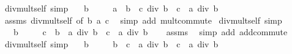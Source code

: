 \begin{isabellebody}
\isanewline
\isanewline
{}\isamarkupfalse%
\ div{\isacharunderscore}{\kern0pt}mult{\isacharunderscore}{\kern0pt}self{}\ {\isacharbrackleft}{\kern0pt}simp{\isacharbrackright}{\kern0pt}{\isacharcolon}{\kern0pt}\isanewline
\ \ \ {\isachardoublequoteopen}b\ {\isasymnoteq}\ {}{\isachardoublequoteclose}\isanewline
\ \ \ {\isachardoublequoteopen}{\isacharparenleft}{\kern0pt}a\ {\isacharplus}{\kern0pt}\ b\ {\isacharasterisk}{\kern0pt}\ c{\isacharparenright}{\kern0pt}\ div\ b\ {\isacharequal}{\kern0pt}\ c\ {\isacharplus}{\kern0pt}\ a\ div\ b{\isachardoublequoteclose}\isanewline
%
\isadelimproof
\ \ %
\endisadelimproof
%
\isatagproof
{}\isamarkupfalse%
\ assms\ div{\isacharunderscore}{\kern0pt}mult{\isacharunderscore}{\kern0pt}self{}\ {\isacharbrackleft}{\kern0pt}of\ b\ a\ c{\isacharbrackright}{\kern0pt}\ \isamarkupfalse%
\ {\isacharparenleft}{\kern0pt}simp\ add{\isacharcolon}{\kern0pt}\ mult{\isachardot}{\kern0pt}commute{\isacharparenright}{\kern0pt}%
\endisatagproof
{\isafoldproof}%
%
\isadelimproof
\isanewline
%
\endisadelimproof
\isanewline
{}\isamarkupfalse%
\ div{\isacharunderscore}{\kern0pt}mult{\isacharunderscore}{\kern0pt}self{}\ {\isacharbrackleft}{\kern0pt}simp{\isacharbrackright}{\kern0pt}{\isacharcolon}{\kern0pt}\isanewline
\ \ \ {\isachardoublequoteopen}b\ {\isasymnoteq}\ {}{\isachardoublequoteclose}\isanewline
\ \ \ {\isachardoublequoteopen}{\isacharparenleft}{\kern0pt}c\ {\isacharasterisk}{\kern0pt}\ b\ {\isacharplus}{\kern0pt}\ a{\isacharparenright}{\kern0pt}\ div\ b\ {\isacharequal}{\kern0pt}\ c\ {\isacharplus}{\kern0pt}\ a\ div\ b{\isachardoublequoteclose}\isanewline
%
\isadelimproof
\ \ %
\endisadelimproof
%
\isatagproof
{}\isamarkupfalse%
\ assms\ \isamarkupfalse%
\ {\isacharparenleft}{\kern0pt}simp\ add{\isacharcolon}{\kern0pt}\ add{\isachardot}{\kern0pt}commute{\isacharparenright}{\kern0pt}%
\endisatagproof
{\isafoldproof}%
%
\isadelimproof
\isanewline
%
\endisadelimproof
\isanewline
{}\isamarkupfalse%
\ div{\isacharunderscore}{\kern0pt}mult{\isacharunderscore}{\kern0pt}self{}\ {\isacharbrackleft}{\kern0pt}simp{\isacharbrackright}{\kern0pt}{\isacharcolon}{\kern0pt}\isanewline
\ \ \ {\isachardoublequoteopen}b\ {\isasymnoteq}\ {}{\isachardoublequoteclose}\isanewline
\ \ \ {\isachardoublequoteopen}{\isacharparenleft}{\kern0pt}b\ {\isacharasterisk}{\kern0pt}\ c\ {\isacharplus}{\kern0pt}\ a{\isacharparenright}{\kern0pt}\ div\ b\ {\isacharequal}{\kern0pt}\ c\ {\isacharplus}{\kern0pt}\ a\ div\ b{\isachardoublequoteclose}\isanewline

\end{isabellebody}
